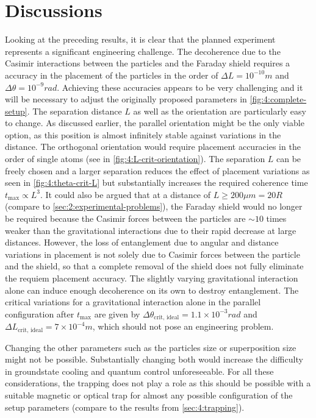 \section{Discussions}\label{sec:4:discussion}
Looking at the preceding results, it is clear that the planned experiment represents a significant engineering challenge. The decoherence due to the Casimir interactions between the particles and the Faraday shield requires a accuracy in the placement of the particles in the order of $\Delta L = 10^{-10}\si{m}$ and $\Delta \theta = 10^{-9}\si{rad}$.
Achieving these accuracies appears to be very challenging and it will be necessary to adjust the originally proposed parameters in \cref{fig:4:complete-setup}. The separation distance $L$ as well as the orientation are particularly easy to change.
As discussed earlier, the parallel orientation might be the only viable option, as this position is almost infinitely stable against variations in the distance. The orthogonal orientation would require placement accuracies in the order of single atoms (see in \cref{fig:4:L-crit-orientation}).
The separation $L$ can be freely chosen and a larger separation reduces the effect of placement variations as seen in \cref{fig:4:theta-crit-L} but substantially increases the required coherence time $t_\mathrm{max} \propto L^3$.
It could also be argued that at a distance of $L \geq 200\si{\mu m} = 20 R$ (compare to \cref{sec:2:experimental-problems}), the Faraday shield would no longer be required because the Casimir forces between the particles are $\sim 10$ times weaker than the gravitational interactions due to their rapid decrease at large distances.
However, the loss of entanglement due to angular and distance variations in placement is not solely due to Casimir forces between the particle and the shield, so that a complete removal of the shield does not fully eliminate the requiem placement accuracy.
The slightly varying gravitational interaction alone can induce enough decoherence on its own to destroy entanglement. 
The critical variations for a gravitational interaction alone in the parallel configuration after $t_\mathrm{max}$ are given by $\Delta \theta_\mathrm{crit,\,ideal} = 1.1 \times 10^{-3}\si{rad}$ and $\Delta L_\mathrm{crit,\,ideal} = 7\times 10^{-4}\si{m}$, which should not pose an engineering problem.

Changing the other parameters such as the particles size or superposition size might not be possible. Substantially changing both would increase the difficulty in groundstate cooling and quantum control unforeseeable.
For all these considerations, the trapping does not play a role as this should be possible with a suitable magnetic or optical trap for almost any possible configuration of the setup parameters (compare to the results from \cref{sec:4:trapping}).

